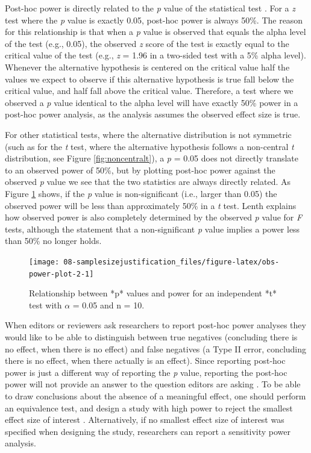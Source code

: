 \documentclass[
]{krantz}
\begin{document}
Post-hoc power is directly related to the \emph{p} value of the statistical test \citep{hoenig_abuse_2001}. For a \emph{z} test where the \emph{p} value is exactly 0.05, post-hoc power is always 50\%. The reason for this relationship is that when a \emph{p} value is observed that equals the alpha level of the test (e.g., 0.05), the observed \emph{z} score of the test is exactly equal to the critical value of the test (e.g., \emph{z} = 1.96 in a two-sided test with a 5\% alpha level). Whenever the alternative hypothesis is centered on the critical value half the values we expect to observe if this alternative hypothesis is true fall below the critical value, and half fall above the critical value. Therefore, a test where we observed a \emph{p} value identical to the alpha level will have exactly 50\% power in a post-hoc power analysis, as the analysis assumes the observed effect size is true.

For other statistical tests, where the alternative distribution is not symmetric (such as for the \emph{t} test, where the alternative hypothesis follows a non-central \emph{t} distribution, see Figure \ref{fig:noncentralt}), a \emph{p} = 0.05 does not directly translate to an observed power of 50\%, but by plotting post-hoc power against the observed \emph{p} value we see that the two statistics are always directly related. As Figure \ref{fig:obs-power-plot-2} shows, if the \emph{p} value is non-significant (i.e., larger than 0.05) the observed power will be less than approximately 50\% in a \emph{t} test. Lenth \citeyearpar{lenth_post_2007} explains how observed power is also completely determined by the observed \emph{p} value for \emph{F} tests, although the statement that a non-significant \emph{p} value implies a power less than 50\% no longer holds.

\begin{figure}

{\centering \texttt{[image: 08-samplesizejustification\_files/figure-latex/obs-power-plot-2-1]} 

}

\caption{Relationship between *p* values and power for an independent *t* test with $\alpha$ = 0.05 and n = 10.}\label{fig:obs-power-plot-2}
\end{figure}

When editors or reviewers ask researchers to report post-hoc power analyses they would like to be able to distinguish between true negatives (concluding there is no effect, when there is no effect) and false negatives (a Type II error, concluding there is no effect, when there actually is an effect). Since reporting post-hoc power is just a different way of reporting the \emph{p} value, reporting the post-hoc power will not provide an answer to the question editors are asking \citep{hoenig_abuse_2001, lenth_post_2007, yuan_post_2005, schulz_sample_2005}. To be able to draw conclusions about the absence of a meaningful effect, one should perform an equivalence test, and design a study with high power to reject the smallest effect size of interest \citep{lakens_equivalence_2018}. Alternatively, if no smallest effect size of interest was specified when designing the study, researchers can report a sensitivity power analysis.
\end{document}

